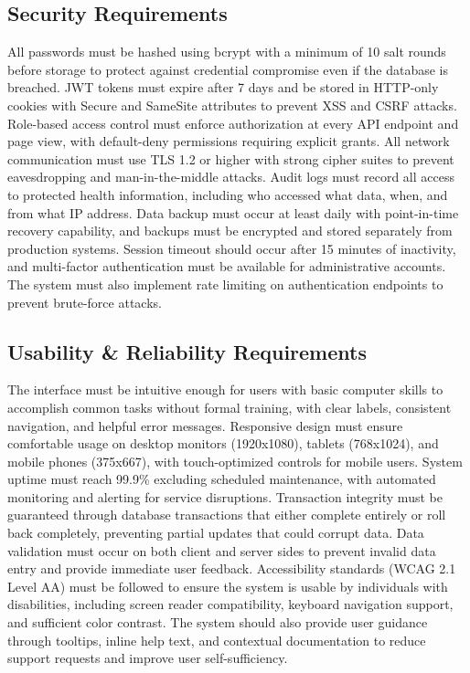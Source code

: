 \subsection{Security Requirements}

\justifying
\noindent All passwords must be hashed using bcrypt with a minimum of 10 salt rounds before storage to protect against credential compromise even if the database is breached. JWT tokens must expire after 7 days and be stored in HTTP-only cookies with Secure and SameSite attributes to prevent XSS and CSRF attacks. Role-based access control must enforce authorization at every API endpoint and page view, with default-deny permissions requiring explicit grants. All network communication must use TLS 1.2 or higher with strong cipher suites to prevent eavesdropping and man-in-the-middle attacks. Audit logs must record all access to protected health information, including who accessed what data, when, and from what IP address. Data backup must occur at least daily with point-in-time recovery capability, and backups must be encrypted and stored separately from production systems. Session timeout should occur after 15 minutes of inactivity, and multi-factor authentication must be available for administrative accounts. The system must also implement rate limiting on authentication endpoints to prevent brute-force attacks.

\subsection{Usability \& Reliability Requirements}

\justifying
\noindent The interface must be intuitive enough for users with basic computer skills to accomplish common tasks without formal training, with clear labels, consistent navigation, and helpful error messages. Responsive design must ensure comfortable usage on desktop monitors (1920x1080), tablets (768x1024), and mobile phones (375x667), with touch-optimized controls for mobile users. System uptime must reach 99.9\% excluding scheduled maintenance, with automated monitoring and alerting for service disruptions. Transaction integrity must be guaranteed through database transactions that either complete entirely or roll back completely, preventing partial updates that could corrupt data. Data validation must occur on both client and server sides to prevent invalid data entry and provide immediate user feedback. Accessibility standards (WCAG 2.1 Level AA) must be followed to ensure the system is usable by individuals with disabilities, including screen reader compatibility, keyboard navigation support, and sufficient color contrast. The system should also provide user guidance through tooltips, inline help text, and contextual documentation to reduce support requests and improve user self-sufficiency.

